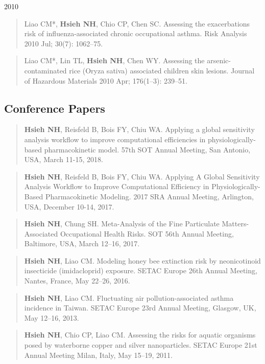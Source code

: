 \documentclass[10pt,]{article}
\begin{document}
2010

\begin{quote}
Liao CM*, \textbf{Hsieh NH}, Chio CP, Chen SC. Assessing the
exacerbations risk of influenza-associated chronic occupational asthma.
Risk Analysis 2010 Jul; 30(7): 1062--75.
\end{quote}

\begin{quote}
Liao CM*, Lin TL, \textbf{Hsieh NH}, Chen WY. Assessing the
arsenic-contaminated rice (Oryza sativa) associated children skin
lesions. Journal of Hazardous Materials 2010 Apr; 176(1--3): 239--51.
\end{quote}

\subsection{Conference Papers}\label{conference-papers}

\begin{quote}
\textbf{Hsieh NH}, Reisfeld B, Bois FY, Chiu WA. Applying a global
sensitivity analysis workflow to improve computational efficiencies in
physiologically-based pharmacokinetic model. 57th SOT Annual Meeting,
San Antonio, USA, March 11-15, 2018.
\end{quote}

\begin{quote}
\textbf{Hsieh NH}, Reisfeld B, Bois FY, Chiu WA. Applying A Global
Sensitivity Analysis Workflow to Improve Computational Efficiency in
Physiologically-Based Pharmacokinetic Modeling. 2017 SRA Annual Meeting,
Arlington, USA, December 10-14, 2017.
\end{quote}

\begin{quote}
\textbf{Hsieh NH}, Chung SH. Meta-Analysis of the Fine Particulate
Matters-Associated Occupational Health Risks. SOT 56th Annual Meeting,
Baltimore, USA, March 12--16, 2017.
\end{quote}

\begin{quote}
\textbf{Hsieh NH}, Liao CM. Modeling honey bee extinction risk by
neonicotinoid insecticide (imidacloprid) exposure. SETAC Europe 26th
Annual Meeting, Nantes, France, May 22--26, 2016.
\end{quote}

\begin{quote}
\textbf{Hsieh NH}, Liao CM. Fluctuating air pollution-associated asthma
incidence in Taiwan. SETAC Europe 23rd Annual Meeting, Glasgow, UK, May
12--16, 2013.
\end{quote}

\begin{quote}
\textbf{Hsieh NH}, Chio CP, Liao CM. Assessing the risks for aquatic
organisms posed by waterborne copper and silver nanoparticles. SETAC
Europe 21st Annual Meeting Milan, Italy, May 15--19, 2011.
\end{quote}
\end{document}
